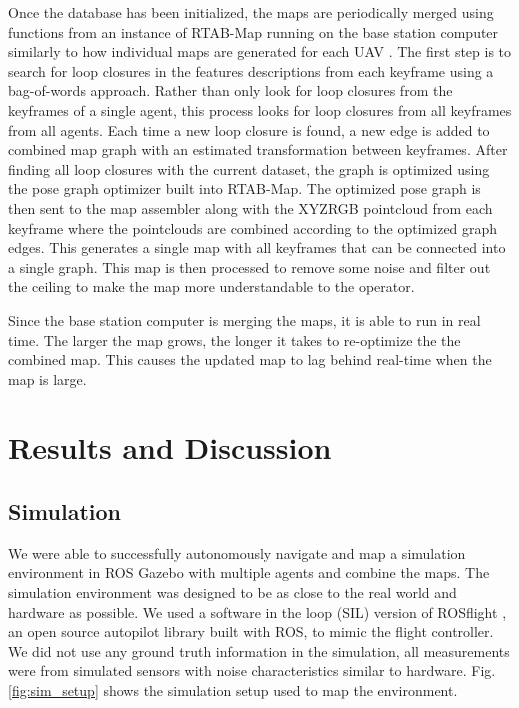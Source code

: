 \documentclass[letterpaper, 10 pt, conference]{ieeeconf}  %
\begin{document}
Once the database has been initialized, the maps are periodically merged using functions from an instance of RTAB-Map running on the base station computer similarly to how individual maps are generated for each UAV \cite{Labbe2011}\cite{Labbe2013}\cite{Labbe2019}. The first step is to search for loop closures in the features descriptions from each keyframe using a bag-of-words approach. Rather than only look for loop closures from the keyframes of a single agent, this process looks for loop closures from all keyframes from all agents. Each time a new loop closure is found, a new edge is added to combined map graph with an estimated transformation between keyframes. After finding all loop closures with the current dataset, the graph is optimized using the pose graph optimizer built into RTAB-Map. The optimized pose graph is then sent to the map assembler along with the XYZRGB pointcloud from each keyframe where the pointclouds are combined according to the optimized graph edges. This generates a single map with all keyframes that can be connected into a single graph. This map is then processed to remove some noise and filter out the ceiling to make the map more understandable to the operator.

Since the base station computer is merging the maps, it is able to run in real time. The larger the map grows, the longer it takes to re-optimize the the combined map. This causes the updated map to lag behind real-time when the map is large.
\section{Results and Discussion}\label{results}

\subsection{Simulation}

We were able to successfully autonomously navigate and map a simulation environment in ROS Gazebo \cite{Gazebo} with multiple agents and combine the maps. The simulation environment was designed to be as close to the real world and hardware as possible. We used a software in the loop (SIL) version of ROSflight \cite{Jackson2016a}, an open source autopilot library built with ROS, to mimic the flight controller. We did not use any ground truth information in the simulation, all measurements were from simulated sensors with noise characteristics similar to hardware. Fig. \ref{fig:sim_setup} shows the simulation setup used to map the environment.
\end{document}
